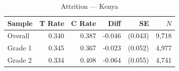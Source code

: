 \begin{table}[htbp]
\centering
\small
\caption{Attrition --- Kenya}
\label{tab:ke_attrition}
\begin{tabular}{l*{5}{r}}
\toprule
Sample & T Rate & C Rate & Diff & SE & $N$ \\
\midrule
Overall & 0.340 & 0.387 & -0.046 & (0.043) & 9,718 \\
\addlinespace
Grade 1 & 0.345 & 0.367 & -0.023 & (0.052) & 4,977 \\
Grade 2 & 0.334 & 0.408 & -0.064 & (0.055) & 4,741 \\
\bottomrule
\end{tabular}
\end{table}